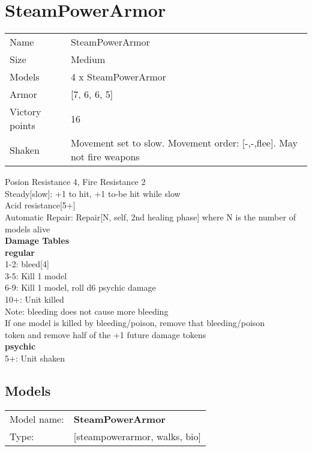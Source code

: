 \section{ SteamPowerArmor }

\begin{tabular}{ll}
  Name & SteamPowerArmor \\
  Size & Medium\\
  Models & 4 x SteamPowerArmor\\
  Armor & [7, 6, 6, 5]\\
  Victory points & 16\\
  Shaken & Movement set to slow. Movement order: [-,-,flee]. May not fire weapons\\
\end{tabular}

Posion Resistance 4, Fire Resistance 2\\ 
Steady[slow]: +1 to hit, +1 to-be hit while slow\\ 
Acid resistance[5+]\\ 
Automatic Repair: Repair[N, self, 2nd healing phase] where N is the number of models alive\\ 



{\bf Damage Tables} \\
 {\bf regular } \\
1-2: bleed[4] \\
3-5: Kill 1 model \\
6-9: Kill 1 model, roll d6 psychic damage \\
10+: Unit killed \\ Note: bleeding does not cause more bleeding \\ If one model is killed by bleeding/poison, remove that bleeding/poison \\ token and remove half of the +1 future damage tokens \\
 {\bf psychic } \\
5+: Unit shaken \\


\clearpage

\subsection{ Models }

\begin{tabular}{ll}
Model name: & {\bf SteamPowerArmor } \\
Type: & [steampowerarmor, walks, bio] \\
\end{tabular}

